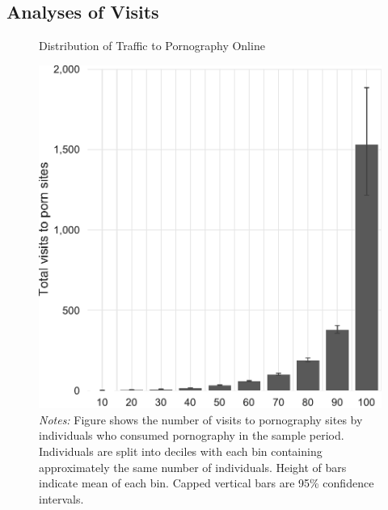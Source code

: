 \documentclass[12pt, letterpaper]{article}
\begin{document}
\subsection{Analyses of Visits}
\label{si:visits}
\begin{figure}[ht]
	\centering
	\caption{Distribution of Traffic to Pornography Online}
	\includegraphics[width=.5\linewidth]{../figs/distribution_visits_to_adultsites.pdf}
	\caption*{\footnotesize \emph{Notes:} 
		Figure shows the number of visits to pornography sites by individuals who consumed pornography in the sample period.
		Individuals are split into deciles with each bin containing approximately the same number of individuals.
		Height of bars indicate mean of each bin.
		Capped vertical bars are 95\% confidence intervals.
	}
	\label{fig:distribution_visits}
\end{figure}
\end{document}
